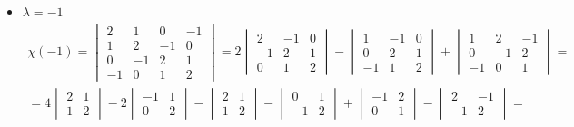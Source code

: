 \begin{itemize}
    \item $ \lambda = -1 $
    \begin{multline*}
        \chi(-1) =
        \begin{vmatrix}
            2 & 1 & 0 & -1 \\
            1 & 2 & -1 & 0 \\
            0 & -1 & 2 & 1 \\
            -1 & 0 & 1 & 2
        \end{vmatrix} = 2
        \begin{vmatrix}
        	2 & -1 & 0 \\
            -1 & 2 & 1 \\
            0 & 1 & 2
        \end{vmatrix} -
        \begin{vmatrix}
        	1 & -1 & 0 \\
            0 & 2 & 1 \\
            -1 & 1 & 2
        \end{vmatrix} +
        \begin{vmatrix}
            1 & 2 & -1 \\
            0 & -1 & 2 \\
            -1 & 0 & 1
        \end{vmatrix} = \\
        = 4
        \begin{vmatrix}
        	2 & 1 \\
            1 & 2
        \end{vmatrix} -2
        \begin{vmatrix}
        	-1 & 1 \\
            0 & 2
        \end{vmatrix} -
        \begin{vmatrix}
        	2 & 1 \\
            1 & 2
        \end{vmatrix} -
        \begin{vmatrix}
        	0 & 1 \\
            -1 & 2
        \end{vmatrix} +
        \begin{vmatrix}
        	-1 & 2 \\
            0 & 1
        \end{vmatrix} -
        \begin{vmatrix}
        	2 & -1 \\
            -1 & 2
        \end{vmatrix} = \\

\end{multline*}
\end{itemize}
